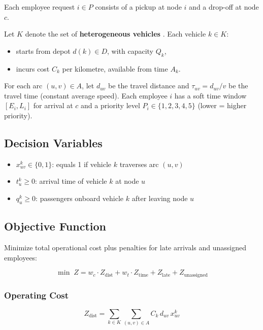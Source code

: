 \documentclass[11pt,a4paper]{article}
\begin{document}
Each employee request $i \in P$ consists of a pickup at node $i$ and a drop-off at node $c$.

Let $K$ denote the set of \textbf{heterogeneous vehicles} \cite{dondo2007,golden2008}. Each vehicle $k \in K$:
\begin{itemize}[nosep, leftmargin=1.2em]
    \item starts from depot $d(k) \in D$, with capacity $Q_k$,
    \item incurs cost $C_k$ per kilometre, available from time $A_k$.
\end{itemize}

For each arc $(u,v) \in A$, let $d_{uv}$ be the travel distance and $\tau_{uv} = d_{uv}/v$ be the travel time (constant average speed). Each employee $i$ has a soft time window $[E_i, L_i]$ for arrival at $c$ and a priority level $P_i \in \{1,2,3,4,5\}$ (lower = higher priority).

\subsection{Decision Variables}

\begin{itemize}[nosep, leftmargin=1.2em]
    \item $x_{uv}^k \in \{0,1\}$: equals 1 if vehicle $k$ traverses arc $(u,v)$
    \item $t_u^k \ge 0$: arrival time of vehicle $k$ at node $u$
    \item $q_u^k \ge 0$: passengers onboard vehicle $k$ after leaving node $u$
\end{itemize}

\subsection{Objective Function}

Minimize total operational cost plus penalties for late arrivals and unassigned employees:

\begin{equation}
\min \; Z = w_c \cdot Z_{\text{dist}} + w_t \cdot Z_{\text{time}} +  Z_{\text{late}} + Z_{\text{unassigned}}
\end{equation}

\subsubsection{Operating Cost}
\begin{equation}
Z_{\text{dist}} =
\sum_{k \in K} \sum_{(u,v)\in A}
C_k \, d_{uv} \, x_{uv}^k
\end{equation}
\end{document}
